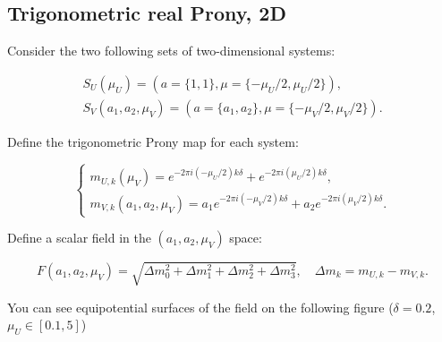 \subsection{Trigonometric real Prony, 2D}

Consider the two following sets of two-dimensional systems:

$$
\begin{array}{l}
S_U(\mu_U) = (a = \{1, 1\}, \mu = \{ -\mu_U/2, \mu_U/2 \}),  \\
S_V(a_1, a_2, \mu_V) = (a = \{a_1, a_2\}, \mu = \{ -\mu_V/2, \mu_V/2 \}).
\end{array}
$$

Define the trigonometric Prony map for each system: 

$$
\begin{cases}
m_{U,k}(\mu_V) = e^{-2\pi i (-\mu_U/2) k \delta} + e^{-2\pi i (\mu_U/2) k \delta}, \\
m_{V,k}(a_1, a_2, \mu_V) = a_1 e^{-2\pi i (-\mu_V/2) k \delta} + a_2 e^{-2\pi i (\mu_V/2) k \delta}.
\end{cases}
$$

Define a scalar field in the $(a_1, a_2, \mu_V)$ space:

$$
F(a_1, a_2, \mu_V) = \sqrt{\Delta m_0^2 + \Delta m_1^2 + \Delta m_2^2 + \Delta m_3^2}, \quad \Delta m_k = m_{U,k} - m_{V,k}.
$$

You can see equipotential surfaces of the field on the following figure ($\delta = 0.2$, $\mu_U \in [0.1, 5]$)
  
  
  
